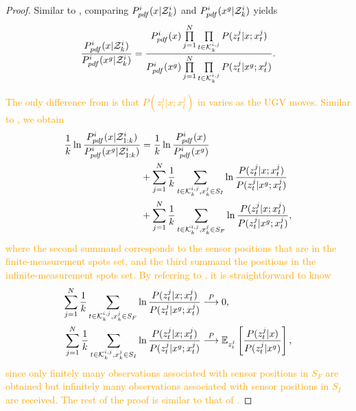 	\begin{proof}		
		Similar to , comparing $P^i_{pdf}(x|\mathcal{Z}^i_k)$ and $P^i_{pdf}(x^g|\mathcal{Z}^i_k)$ yields		
		\small\begin{equation}\label{eqn:cmp2}
		\frac{P^i_{pdf}(x|\mathcal{Z}^i_k)}{P^i_{pdf}(x^g|\mathcal{Z}^i_k)}=\frac{P^i_{pdf}(x)\prod\limits_{j=1}^{N}\prod\limits_{t\in\mathcal{K}^{i,j}_{k}}P(z^j_t|x;x^j_t)}{P^i_{pdf}(x^g)\prod\limits_{j=1}^{N}\prod\limits_{t\in\mathcal{K}^{i,j}_{k}}P(z^j_t|x^g;x^j_t)}.
		\end{equation}\normalsize
			
		\textcolor{orange}{
		The only difference from  is that $P(z^j_l|x;x^j_l)$ in  varies as the UGV moves.
		Similar to , we obtain 
		\begin{equation*}
		\begin{split}
		\frac{1}{k}\ln\frac{P^i_{pdf}(x|\mathcal{Z}^i_{1:k})}{P^i_{pdf}(x^g|\mathcal{Z}^i_{1:k})}&=\frac{1}{k}\ln\frac{P^i_{pdf}(x)}{P^i_{pdf}(x^g)}\\
		&+\sum\limits_{j=1}^{N}\frac{1}{k}\sum\limits_{t\in\mathcal{K}^{i,j}_{k},x^j_k\in S_I}\ln\frac{P(z^j_t|x;x^j_t)}{P(z^j_t|x^g;x^j_t)}\\
		&+\sum\limits_{j=1}^{N}\frac{1}{k}\sum\limits_{t\in\mathcal{K}^{i,j}_{k},x^j_k\in S_F}\ln\frac{P(z^j_t|x;x^j_t)}{P(z^j_t|x^g;x^j_t)},
		\end{split}		
		\end{equation*}
		where the second summand corresponds to the sensor positions that are in the finite-measurement spots set, and the third summand the positions in the infinite-measurement spots set. 
		By referring to , it is straightforward to know
		\begin{equation*}
		\begin{split}
		\sum\limits_{j=1}^{N}\frac{1}{k}\sum\limits_{t\in\mathcal{K}^{i,j}_{k},x^j_k\in S_F}\ln\frac{P(z^j_t|x;x^j_t)}{P(z^j_t|x^g;x^j_t)}&\overset{P}{\longrightarrow} 0,\\
		\sum\limits_{j=1}^{N}\frac{1}{k}\sum\limits_{t\in\mathcal{K}^{i,j}_{k},x^j_k\in S_I}\ln\frac{P(z^j_t|x;x^j_t)}{P(z^j_t|x^g;x^j_t)}&\overset{P}{\longrightarrow} \mathbb{E}_{z^j_t} \left[\frac{P(z^j_t|x)}{P(z^j_t|x^g)}\right],
		\end{split}		
		\end{equation*}
		since only finitely many observations associated with sensor positions in $S_F$ are obtained but infinitely many observations associated with sensor positions in $S_I$ are received.
		The rest of the proof is similar to that of .}
		
	\end{proof}
			
